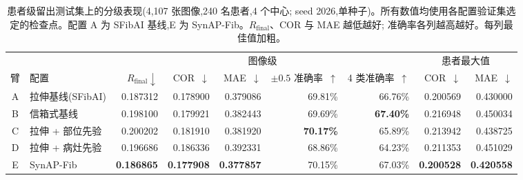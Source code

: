 \begin{table}[!t]
\centering
\caption{患者级留出测试集上的分级表现(4,107 张图像,240 名患者,4 个中心;
seed 2026,单种子)。所有数值均使用各配置验证集选定的检查点。配置 A 为
SFibAI 基线,E 为 SynAP-Fib。$R_{\mathrm{final}}$、COR 与 MAE 越低越好;
准确率各列越高越好。每列最佳值加粗。}
\label{tab:main}
\small
\begin{tabular}{@{}clrrrrrrr@{}}
\toprule
 & & \multicolumn{5}{c}{图像级} & \multicolumn{2}{c}{患者最大值} \\
\cmidrule(lr){3-7} \cmidrule(lr){8-9}
臂 & 配置 & $R_{\mathrm{final}}\downarrow$ & COR~$\downarrow$ & MAE~$\downarrow$ & $\pm0.5$ 准确率~$\uparrow$ & 4 类准确率~$\uparrow$ & COR~$\downarrow$ & MAE~$\downarrow$ \\
\midrule
A & 拉伸基线(SFibAI) & 0.187312 & 0.178900 & 0.379086 & 69.81\% & 66.76\% & 0.200569 & 0.430000 \\
B & 信箱式基线 & 0.198100 & 0.179921 & 0.382443 & 69.69\% & \textbf{67.40\%} & 0.216948 & 0.450034 \\
C & 拉伸 + 部位先验 & 0.200202 & 0.181910 & 0.381920 & \textbf{70.17\%} & 65.89\% & 0.213942 & 0.438725 \\
D & 拉伸 + 病灶先验 & 0.196686 & 0.186336 & 0.392331 & 68.86\% & 64.23\% & 0.211353 & 0.451029 \\
E & SynAP-Fib & \textbf{0.186865} & \textbf{0.177908} & \textbf{0.377857} & 70.15\% & 67.03\% & \textbf{0.200528} & \textbf{0.420558} \\
\bottomrule
\end{tabular}
\end{table}
